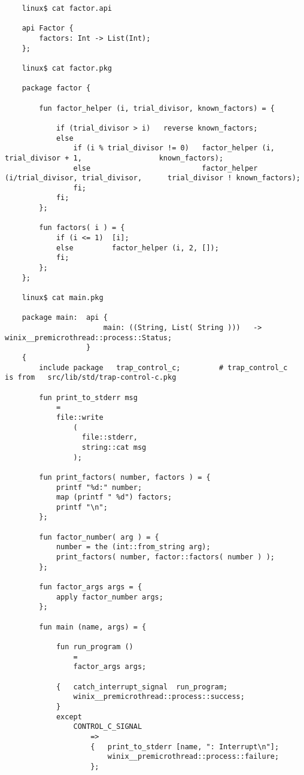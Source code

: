 \begin{verbatim}
    linux$ cat factor.api

    api Factor {
        factors: Int -> List(Int);
    };

    linux$ cat factor.pkg

    package factor {

        fun factor_helper (i, trial_divisor, known_factors) = {

            if (trial_divisor > i)   reverse known_factors;
            else
                if (i % trial_divisor != 0)   factor_helper (i,               trial_divisor + 1,                  known_factors);
                else                          factor_helper (i/trial_divisor, trial_divisor,      trial_divisor ! known_factors);
                fi;
            fi;
        };

        fun factors( i ) = {
            if (i <= 1)  [i];
            else         factor_helper (i, 2, []);
            fi;
        };
    };

    linux$ cat main.pkg

    package main:  api {
                       main: ((String, List( String )))   ->   winix__premicrothread::process::Status;
                   }
    {
        include package   trap_control_c;         # trap_control_c        is from   src/lib/std/trap-control-c.pkg

        fun print_to_stderr msg
            =
            file::write
                (
                  file::stderr,
                  string::cat msg
                );

        fun print_factors( number, factors ) = {
            printf "%d:" number;
            map (printf " %d") factors;
            printf "\n";
        };

        fun factor_number( arg ) = {
            number = the (int::from_string arg);
            print_factors( number, factor::factors( number ) );
        };

        fun factor_args args = {
            apply factor_number args;
        };

        fun main (name, args) = {

            fun run_program ()
                =
                factor_args args;

            {   catch_interrupt_signal  run_program;
                winix__premicrothread::process::success;
            }
            except
                CONTROL_C_SIGNAL
                    =>
                    {   print_to_stderr [name, ": Interrupt\n"];
                        winix__premicrothread::process::failure;
                    };


\end{verbatim}
